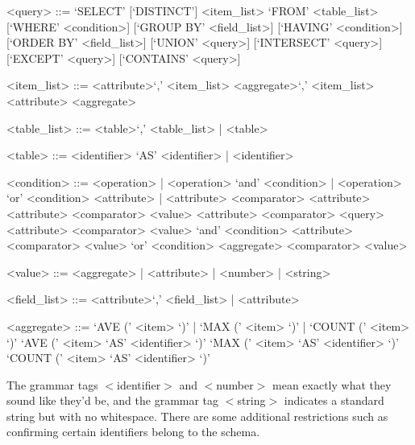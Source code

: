 \documentclass[]{article}
\begin{document}
	\begin{grammar}
		
		<query> ::= `SELECT' [`DISTINCT'] <item\_list> `FROM' <table\_list> [`WHERE' <condition>] [`GROUP BY' <field\_list>] [`HAVING' <condition>] [`ORDER BY' <field\_list>] [`UNION' <query>] [`INTERSECT' <query>] [`EXCEPT' <query>] [`CONTAINS' <query>] 
		
		<item\_list> ::= <attribute>`,' <item\_list>
		\alt <aggregate>`,' <item\_list>
		\alt <attribute>
		\alt <aggregate>
		
		<table\_list> ::= <table>`,' <table\_list> | <table>
		
		<table> ::= <identifier> `AS' <identifier> | <identifier>
		
		<condition> ::= <operation> | <operation> `and' <condition> | <operation> `or' <condition>
		\alt <attribute> | <attribute> <comparator> <attribute>
		\alt <attribute> <comparator> <value>
		\alt <attribute> <comparator> <query>
		\alt <attribute> <comparator> <value> `and' <condition>
		\alt <attribute> <comparator> <value> `or' <condition>
		\alt <aggregate> <comparator> <value>
		
		<value> ::= <aggregate> | <attribute> | <number> | <string>
		
		<field\_list> ::= <attribute>`,' <field\_list> | <attribute>
		
		<aggregate> ::= `AVE (' <item> `)' | `MAX (' <item> `)' | `COUNT (' <item> `)'
		\alt `AVE (' <item> `AS' <identifier> `)'
		\alt `MAX (' <item> `AS' <identifier> `)'
		\alt `COUNT (' <item> `AS' <identifier> `)'
		
	\end{grammar}
	
	The grammar tags $<$identifier$>$ and $<$number$>$ mean exactly what they sound like they'd be, and the grammar tag $<$string$>$ indicates a standard string but with no whitespace. There are some additional restrictions such as confirming certain identifiers belong to the schema.
	
	
	
\end{document}
